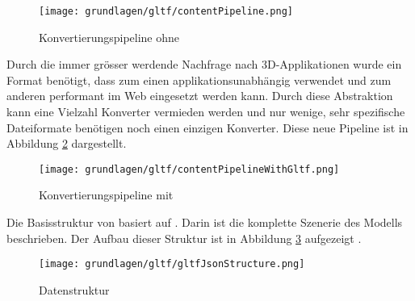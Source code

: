 \begin{figure}[H]
  \centering
  \texttt{[image: grundlagen/gltf/contentPipeline.png]}
  \caption{Konvertierungspipeline ohne  \cite{gltfTutorialIntro}}
  \label{fig:contentPipelineWithoutGltf}
\end{figure}

Durch die immer grösser werdende Nachfrage nach 3D-Applikationen wurde ein Format benötigt, dass zum einen applikationsunabhängig verwendet und zum anderen performant im Web eingesetzt werden kann.
Durch diese Abstraktion kann eine Vielzahl Konverter vermieden werden und nur wenige, sehr spezifische Dateiformate benötigen noch einen einzigen Konverter. Diese neue Pipeline ist in Abbildung \ref{fig:contentPipelineWithGltf} dargestellt. \cite{gltfTutorialIntro}
\begin{figure}[H]
  \centering
  \texttt{[image: grundlagen/gltf/contentPipelineWithGltf.png]}
  \caption{Konvertierungspipeline mit  \cite{gltfTutorialIntro}}
  \label{fig:contentPipelineWithGltf}
\end{figure}

\pagebreak

Die Basisstruktur von  basiert auf . Darin ist die komplette Szenerie des Modells beschrieben. Der Aufbau dieser Struktur ist in Abbildung \ref{fig:gltfDatastructure} aufgezeigt \cite{gltfTutorialStructure}.
\begin{figure}[H]
  \centering
  \texttt{[image: grundlagen/gltf/gltfJsonStructure.png]}
  \caption{ Datenstruktur \cite{gltfTutorialStructure}}
  \label{fig:gltfDatastructure}
\end{figure}


